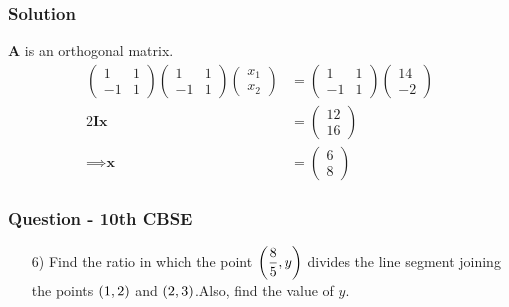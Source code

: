 \documentclass{beamer}
\begin{document}
\begin{frame}
\frametitle{Solution}
\textbf{A} is an orthogonal matrix.
    \begin{align}
            \begin{pmatrix}
        1 & 1\\
        -1 & 1
    \end{pmatrix}
    \begin{pmatrix}
        1 & 1\\
        -1 & 1
    \end{pmatrix}
    \begin{pmatrix}
        x_1\\
        x_2
    \end{pmatrix} &= 
    \begin{pmatrix}
        1 & 1\\
        -1 & 1
    \end{pmatrix}
    \begin{pmatrix}
        14\\
        -2
    \end{pmatrix} \\
    2\textbf{I}\textbf{x} &= \begin{pmatrix}
        12\\
        16
    \end{pmatrix}\\
    \implies \textbf{x} &= \begin{pmatrix}
        6\\
        8
    \end{pmatrix}
\end{align}
\end{frame}






\begin{frame}
\frametitle{Question - 10th CBSE}
\begin{enumerate}
    \item [6)]
Find the ratio in which the point $\left(\dfrac{8}{5},y\right)$ divides the line segment joining the points $\left(1,2\right)$ and $\left(2,3\right)$.Also, find the value of $y$. 
\end{enumerate}
\end{frame}
\end{document}
